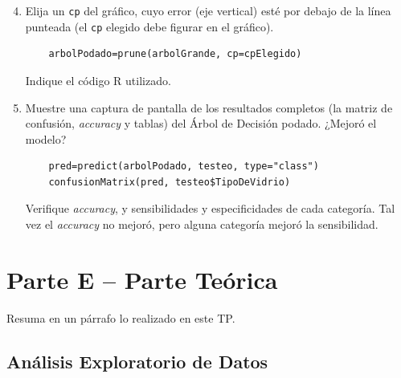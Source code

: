 \begin{enumerate}
    \setcounter{enumi}{3}
    \item Elija un \texttt{cp} del gráfico, cuyo error (eje vertical) esté por debajo de la línea punteada (el \texttt{cp} elegido debe figurar en el gráfico).
    \begin{verbatim}
    arbolPodado=prune(arbolGrande, cp=cpElegido)
    \end{verbatim}
    Indique el código R utilizado.
    
    \item Muestre una captura de pantalla de los resultados completos (la matriz de confusión, \textit{accuracy} y tablas) del Árbol de Decisión podado. ¿Mejoró el modelo?
    \begin{verbatim}
    pred=predict(arbolPodado, testeo, type="class")
    confusionMatrix(pred, testeo$TipoDeVidrio)
    \end{verbatim}
    Verifique \textit{accuracy}, y sensibilidades y especificidades de cada categoría. Tal vez el \textit{accuracy} no mejoró, pero alguna categoría mejoró la sensibilidad.
\end{enumerate}

\section*{Parte E – Parte Teórica}

Resuma en un párrafo lo realizado en este TP.

\subsection{Análisis Exploratorio de Datos}
